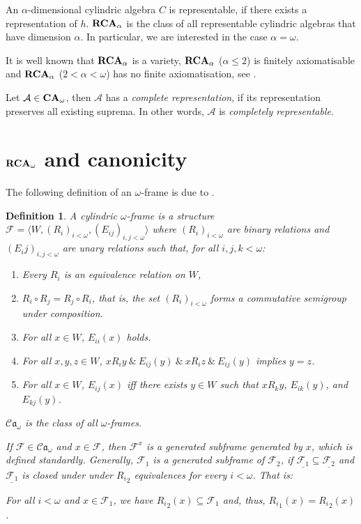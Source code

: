\documentclass[a4paper]{article}
\theoremstyle{defin}
\newtheorem{defin}{Definition}
\theoremstyle{theorem}
\theoremstyle{claim}
\theoremstyle{prop}
\theoremstyle{lemma}
\theoremstyle{fact}
\theoremstyle{ex}
\theoremstyle{col}
\begin{document}
An $\alpha$-dimensional cylindric algebra $C$ is representable, if there exists a representation of $h$.
${\bf RCA}_{\alpha}$ is the class of all representable cylindric algebras that have dimension $\alpha$. In particular, we are interested in the case $\alpha = \omega$.

It is well known that ${\bf RCA}_{\alpha}$ is a variety, ${\bf RCA}_{\alpha}$ ($\alpha \leq 2$) is finitely axiomatisable and ${\bf RCA}_{\alpha}$ ($2 < \alpha < \omega$) has no finite axiomatisation, see \cite{Henkin1988-HENCAP-4}.

Let $\mathcal{A} \in {\bf CA}_{\omega}$, then $\mathcal{A}$ has a \emph{complete representation}, if its representation preserves all existing suprema. In other words, $\mathcal{A}$ is \emph{completely representable}.

\section{${\bf RCA}_{\omega}$ and canonicity}

The following definition of an $\omega$-frame is due to \cite{Venema2013}.
\begin{defin}
  A cylindric $\omega$-frame is a structure $\mathcal{F} = \langle W, (R_i)_{i < \omega}, (E_{ij})_{i, j < \omega} \rangle$ where $(R_i)_{i < \omega}$ are binary relations and $(E_ij)_{i, j < \omega}$ are unary relations such that, for all $i, j, k < \omega$:
  \begin{enumerate}
  \item Every $R_i$ is an equivalence relation on $W$,
  \item $R_i \circ R_j = R_j \circ R_i$, that is, the set $(R_i)_{i < \omega}$ forms a commutative semigroup under composition.
  \item For all $x \in W$, $E_{ii}(x)$ holds.
  \item For all $x, y, z \in W$, $x R_i y \: \& \: E_{ij}(y) \: \& \: x R_i z \: \& \: E_{ij}(y)$ implies $y = z$.
  \item For all $x \in W$, $E_{ij}(x)$ iff there exists $y \in W$ such that $x R_k y$, $E_{ik}(y)$, and $E_{kj}(y)$.
  \end{enumerate}
  $\mathcal{C}\mathfrak{a}_{\omega}$ is the class of all $\omega$-frames.

  If $\mathcal{F} \in \mathcal{C}\mathfrak{a}_{\omega}$ and $x \in \mathcal{F}$, then $\mathcal{F}^{x}$ is a generated subframe generated by $x$, which is defined standardly. Generally, $\mathcal{F}_1$ is a generated subframe of $\mathcal{F}_2$, if $\underline{\mathcal{F}_1} \subseteq \underline{\mathcal{F}_2}$ and $\underline{\mathcal{F}_1}$ is closed under under ${R_i}_2$ equivalences for every $i < \omega$. That is:
  \begin{center}
  For all $i < \omega$ and $x \in \mathcal{F}_1$, we have ${R_i}_2(x) \subseteq \mathcal{F}_1$ and, thus, ${R_i}_1(x) = {R_i}_2(x)$.
  \end{center}
\end{defin}
\end{document}
